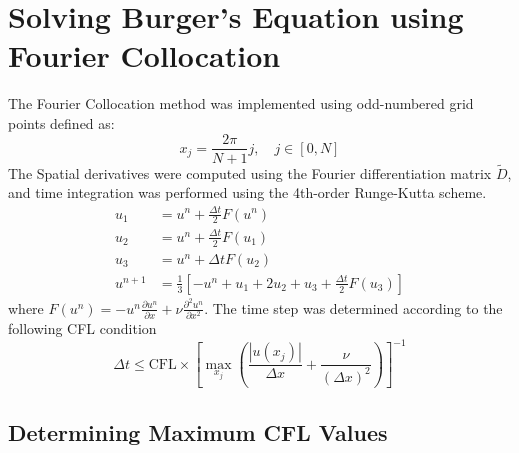 \section{Solving Burger's Equation using Fourier Collocation}
The Fourier Collocation method was implemented using odd-numbered grid points defined as:
\begin{equation}
	x_j = \frac{2\pi}{N+1}j, \quad j \in [0, N]
\end{equation}
The Spatial derivatives were computed using the Fourier differentiation matrix $\tilde{D}$, and time integration was performed using the 4th-order Runge-Kutta scheme.
\begin{equation}
	\begin{align}
		u_1     & = u^n + \frac{\Delta t}{2}F(u^n)                                             \\
		u_2     & = u^n + \frac{\Delta t}{2}F(u_1)                                             \\
		u_3     & = u^n + \Delta t F(u_2)                                                      \\
		u^{n+1} & = \frac{1}{3}\left[-u^n + u_1 + 2u_2 + u_3 + \frac{\Delta t}{2}F(u_3)\right]
	\end{align}
	\label{eq:rk4_burgers}
\end{equation}
where $F(u^n) = -u^n\frac{\partial u^n}{\partial x} + \nu\frac{\partial^2 u^n}{\partial x^2}$.\newline
The time step was determined according to the following CFL condition
\begin{equation}
	\Delta t \leq \text{CFL} \times \left[\max_{x_j} \left(\frac{|u(x_j)|}{\Delta x} + \frac{\nu}{(\Delta x)^2}\right) \right]^{-1}
\end{equation}

\subsection{Determining Maximum CFL Values}

